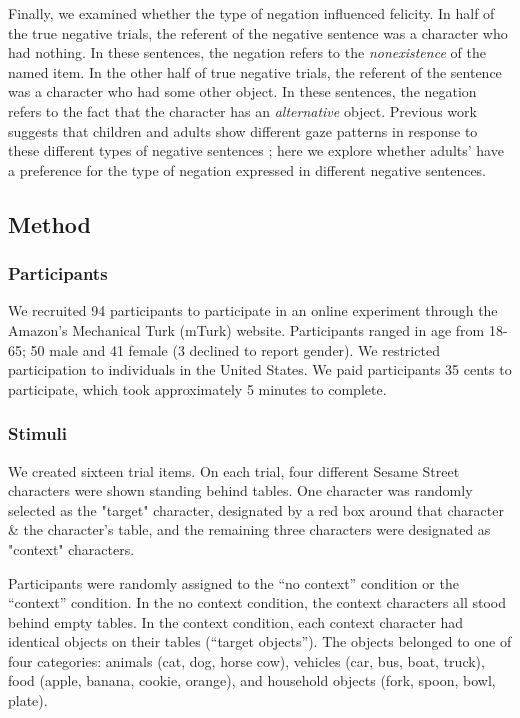 \documentclass[10pt,letterpaper]{article}
\begin{document}
Finally, we examined whether the type of negation influenced felicity.  In half of the true negative trials, the referent of the negative sentence was a character who had nothing.  In these sentences, the negation refers to the \emph{nonexistence} of the named item.  In the other half of true negative trials, the referent of the sentence was a character who had some other object.  In these sentences, the negation refers to the fact that the character has an \emph{alternative} object.  Previous work suggests that children and adults show different gaze patterns in response to these different types of negative sentences \cite{nordmeyer2014b}; here we explore whether adults' have a preference for the type of negation expressed in different negative sentences.

\subsection{Method}

\subsubsection{Participants}
We recruited 94 participants to participate in an online experiment through the Amazon's Mechanical Turk (mTurk) website.  Participants ranged in age from 18-65; 50 male and 41 female (3 declined to report gender).  We restricted participation to individuals in the United States. We paid participants 35 cents to participate, which took approximately 5 minutes to complete.  


\subsubsection{Stimuli}
We created sixteen trial items.  On each trial, four different Sesame Street characters were shown standing behind tables.  One character was randomly selected as the "target" character, designated by a red box around that character \& the character's table, and the remaining three characters were designated as "context" characters.

Participants were randomly assigned to the ``no context'' condition or the ``context'' condition.  In the no context condition, the context characters all stood behind empty tables.  In the context condition, each context character had identical objects on their tables (``target objects'').  The objects belonged to one of four categories: animals (cat, dog, horse cow), vehicles (car, bus, boat, truck), food (apple, banana, cookie, orange), and household objects (fork, spoon, bowl, plate).  
\end{document}
